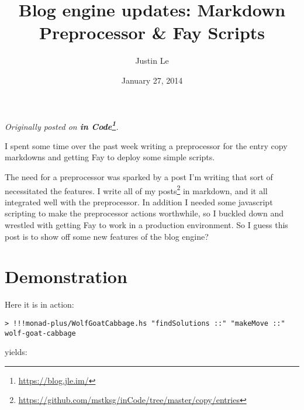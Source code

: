 \documentclass[]{article}
\title{Blog engine updates: Markdown Preprocessor \& Fay Scripts}
\author{Justin Le}
\date{January 27, 2014}
\newenvironment{Shaded}{}{}
\newcommand{\KeywordTok}[1]{\textcolor[rgb]{0.00,0.44,0.13}{\textbf{{#1}}}}
\newcommand{\DataTypeTok}[1]{\textcolor[rgb]{0.56,0.13,0.00}{{#1}}}
\newcommand{\CommentTok}[1]{\textcolor[rgb]{0.38,0.63,0.69}{\textit{{#1}}}}
\newcommand{\OtherTok}[1]{\textcolor[rgb]{0.00,0.44,0.13}{{#1}}}
\newcommand{\FunctionTok}[1]{\textcolor[rgb]{0.02,0.16,0.49}{{#1}}}
\newcommand{\NormalTok}[1]{{#1}}
\renewcommand{\href}[2]{#2\footnote{\url{#1}}}
\begin{document}
\maketitle

\emph{Originally posted on \textbf{\href{https://blog.jle.im/}{in
Code}}.}

I spent some time over the past week writing a preprocessor for the
entry copy markdowns and getting Fay to deploy some simple scripts.

The need for a preprocessor was sparked by a post I'm writing that sort
of necessitated the features. I write
\href{https://github.com/mstksg/inCode/tree/master/copy/entries}{all of
my posts} in markdown, and it all integrated well with the preprocessor.
In addition I needed some javascript scripting to make the preprocessor
actions worthwhile, so I buckled down and wrestled with getting Fay to
work in a production environment. So I guess this post is to show off
some new features of the blog engine?

\section{Demonstration}\label{demonstration}

Here it is in action:

\begin{verbatim}
> !!!monad-plus/WolfGoatCabbage.hs "findSolutions ::" "makeMove ::" wolf-goat-cabbage
\end{verbatim}

yields:

\begin{Shaded}
\end{Shaded}
\end{document}

